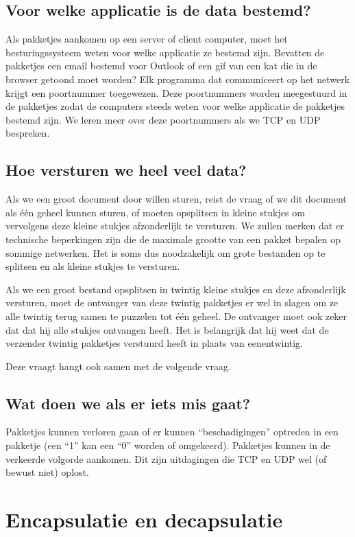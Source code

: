 \subsection{Voor welke applicatie is de data bestemd?}
Als pakketjes aankomen op een server of client computer, moet het besturingssysteem weten voor welke applicatie ze bestemd zijn.
Bevatten de pakketjes een email bestemd voor Outlook of een gif van een kat die in de browser getoond moet worden?
Elk programma dat communiceert op het netwerk krijgt een poortnummer toegewezen.
Deze poortnummers worden meegestuurd in de pakketjes zodat de computers steeds weten voor welke applicatie de pakketjes bestemd zijn.
We leren meer over deze poortnummers als we TCP en UDP bespreken.

\subsection{Hoe versturen we heel veel data?}
Als we een groot document door willen sturen, reist de vraag of we dit document als één geheel kunnen sturen, of moeten opsplitsen in kleine stukjes om vervolgens deze kleine stukjes afzonderlijk te versturen.
We zullen merken dat er technische beperkingen zijn die de maximale grootte van een pakket bepalen op sommige netwerken.
Het is soms dus noodzakelijk om grote bestanden op te splitsen en als kleine stukjes te versturen.

Als we een groot bestand opsplitsen in twintig kleine stukjes en deze afzonderlijk versturen, moet de ontvanger van deze twintig pakketjes er wel in slagen om ze alle twintig terug samen te puzzelen tot één geheel.
De ontvanger moet ook zeker dat dat hij alle stukjes ontvangen heeft.
Het is belangrijk dat hij weet dat de verzender twintig pakketjes verstuurd heeft in plaats van eenentwintig.

Deze vraagt hangt ook samen met de volgende vraag.

\subsection{Wat doen we als er iets mis gaat?}
Pakketjes kunnen verloren gaan of er kunnen ``beschadigingen'' optreden in een pakketje (een ``1'' kan een ``0'' worden of omgekeerd).
Pakketjes kunnen in de verkeerde volgorde aankomen.
Dit zijn uitdagingen die TCP en UDP wel (of bewust niet) oplost.




\section{Encapsulatie en decapsulatie}

